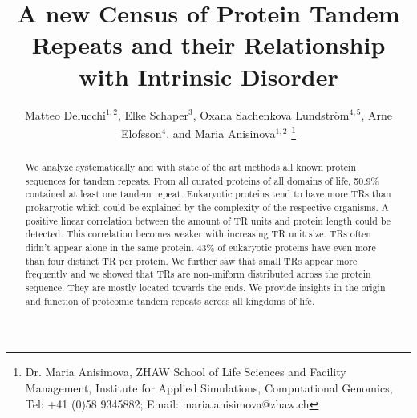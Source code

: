 \documentclass[a4,center,fleqn]{NAR}
\begin{document}
\title{A new Census of Protein Tandem Repeats and their Relationship with Intrinsic Disorder}

\author{%
Matteo Delucchi$^{1,2}$,
Elke Schaper$^{3}$,
Oxana Sachenkova Lundstr\"om$^{4,5}$,
Arne Elofsson$^{4}$,
and Maria Anisinova$^{1,2}$
\footnote{Dr. Maria Anisimova, ZHAW School of Life Sciences and Facility Management, Institute for Applied Simulations, Computational Genomics, Tel: +41 (0)58 9345882; Email: maria.anisimova@zhaw.ch}}

\address{%
$^{1}$, ZHAW W\"adenswil, Switzerland 
$^{2}$, Swiss Institute of Bioinformatics, Lausanne, Switzerland 
$^{3}$, Currently at Carbon Delta AG, Switzerland 
$^{4}$, Stockholm University, Stockholm, Sweden 
$^{5}$, Currently at Aiwizo AB, Stockholm, Sweden   
}


\maketitle

\begin{abstract} %
We analyze systematically and with state of the art methods all known protein sequences for tandem repeats.
From all curated proteins of all domains of life, 50.9\% contained at least one tandem repeat. Eukaryotic proteins tend to have more TRs than prokaryotic which could be explained by the complexity of the respective organisms. 
A positive linear correlation between the amount of TR units and protein length could be detected. This correlation becomes weaker with increasing TR unit size.
TRs often didn't appear alone in the same protein. 43\% of eukaryotic proteins have even more than four distinct TR per protein. We further saw that small TRs appear more frequently and we showed that TRs are non-uniform distributed across the protein sequence. They are mostly located towards the ends.
We provide insights in the origin and function of proteomic tandem repeats across all kingdoms of life.
\end{abstract}
\end{document}
